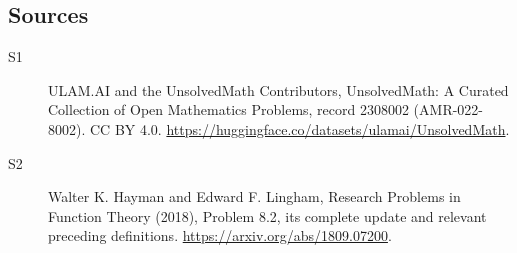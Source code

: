 \documentclass[11pt]{article}
\begin{document}
\subsection{Sources}
\begin{description}
\item[\hypertarget{source:2308002:1}{S1}] ULAM.AI and the UnsolvedMath Contributors, UnsolvedMath: A Curated Collection of Open Mathematics Problems, record 2308002 (AMR-022-8002). CC BY 4.0. \url{https://huggingface.co/datasets/ulamai/UnsolvedMath}.
\item[\hypertarget{source:2308002:2}{S2}] Walter K. Hayman and Edward F. Lingham, Research Problems in Function Theory (2018), Problem 8.2, its complete update and relevant preceding definitions. \url{https://arxiv.org/abs/1809.07200}.
\end{description}
\label{end:2308002}
\end{document}
